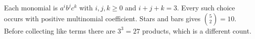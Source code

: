 Each monomial is $a^ib^jc^k$ with $i,j,k\ge0$ and $i+j+k=3$. Every such choice occurs with positive multinomial coefficient. Stars and bars gives $\binom52=\boxed{10}$. Before collecting like terms there are $3^3=27$ products, which is a different count.
